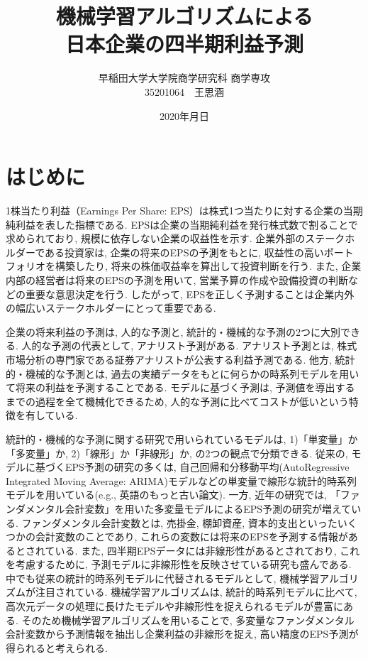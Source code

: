 \documentclass[a4paper, 12pt]{jsreport}
\title{機械学習アルゴリズムによる\\
  日本企業の四半期利益予測}
\author{早稲田大学大学院商学研究科 商学専攻\\
  35201064　王思涵}
\date{2020年月日}
\begin{document}
\maketitle
\tableofcontents

\chapter{はじめに}

1株当たり利益（Earnings Per Share: EPS）は株式1つ当たりに対する企業の当期純利益を表した指標である. EPSは企業の当期純利益を発行株式数で割ることで求められており, 規模に依存しない企業の収益性を示す. 企業外部のステークホルダーである投資家は, 企業の将来のEPSの予測をもとに, 収益性の高いポートフォリオを構築したり, 将来の株価収益率を算出して投資判断を行う. また, 企業内部の経営者は将来のEPSの予測を用いて, 営業予算の作成や設備投資の判断などの重要な意思決定を行う. したがって, EPSを正しく予測することは企業内外の幅広いステークホルダーにとって重要である. 

企業の将来利益の予測は, 人的な予測と, 統計的・機械的な予測の2つに大別できる\citep{sakurai1990}. 人的な予測の代表として, アナリスト予測がある. アナリスト予測とは, 株式市場分析の専門家である証券アナリストが公表する利益予測である. 他方, 統計的・機械的な予測とは, 過去の実績データをもとに何らかの時系列モデルを用いて将来の利益を予測することである. モデルに基づく予測は, 予測値を導出するまでの過程を全て機械化できるため, 人的な予測に比べてコストが低いという特徴を有している\citep{sakurai1990}. 

統計的・機械的な予測に関する研究で用いられているモデルは, 1)「単変量」か「多変量」か, 2)「線形」か「非線形」か, の2つの観点で分類できる\citep{zhang2004neural}. 従来の, モデルに基づくEPS予測の研究の多くは, 自己回帰和分移動平均(AutoRegressive Integrated Moving Average: ARIMA)モデル\citep*{box2015time}などの単変量で線形な統計的時系列モデルを用いている(e.g., 英語のもっと古い論文). 一方, 近年の研究では, 「ファンダメンタル会計変数」を用いた多変量モデルによるEPS予測の研究が増えている. ファンダメンタル会計変数とは, 売掛金, 棚卸資産, 資本的支出といったいくつかの会計変数のことであり, これらの変数には将来のEPSを予測する情報があるとされている\citep{lev1993fundamental, abarbanell1997fundamental}. また, 四半期EPSデータには非線形性があるとされており\citep*{hopwood1986univariate}, これを考慮するために, 予測モデルに非線形性を反映させている研究も盛んである. 中でも従来の統計的時系列モデルに代替されるモデルとして, 機械学習アルゴリズムが注目されている. 機械学習アルゴリズムは, 統計的時系列モデルに比べて, 高次元データの処理に長けたモデルや非線形性を捉えられるモデルが豊富にある\citep*{cao2020fundamental}. そのため機械学習アルゴリズムを用いることで, 多変量なファンダメンタル会計変数から予測情報を抽出し企業利益の非線形を捉え, 高い精度のEPS予測が得られると考えられる. 
\end{document}
